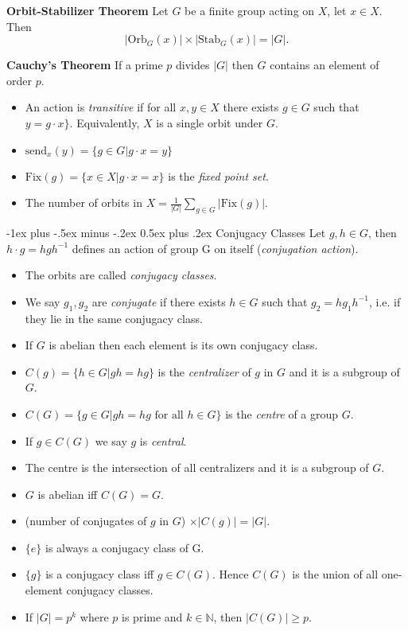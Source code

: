 \documentclass[10pt,landscape]{article}
\makeatletter
\renewcommand{\section}{\@startsection{section}{1}{0mm}%
                                {-1ex plus -.5ex minus -.2ex}%
                                {0.5ex plus .2ex}%
                                {\normalfont\large\bfseries}}
\makeatother
\begin{document}
\begin{multicols}{3}
\columnbreak

\textbf{Orbit-Stabilizer Theorem} Let $G$ be a finite group acting on $X$, let $x\in X$. Then $$ |\text{Orb}_G (x)| \times |\text{Stab}_G (x)| = |G|.$$

\textbf{Cauchy's Theorem} If a prime $p$ divides $|G|$ then $G$ contains an element of order $p$.

\begin{itemize}
	\item An action is \emph{transitive} if for all $x,y \in X$ there exists $g\in G$ such that $y = g \cdot x\}$. Equivalently, $X$ is a single orbit under $G$.
	\item $\text{send}_x (y) = \{g \in G | g \cdot x = y \}$
	\item $\text{Fix}(g) = \{x \in X | g \cdot x = x \}$ is the \emph{fixed point set}.
	\item The number of orbits in $X = \frac{1}{|G|} \sum_{g\in G} |\text{Fix}(g)|.$
\end{itemize}

\section{Conjugacy Classes}
Let $g,h \in G$, then $h \cdot g = hgh^{-1}$ defines an action of group G on itself (\emph{conjugation action}). 
\begin{itemize}
	\item The orbits are called \emph{conjugacy classes}.
	\item We say $g_1,g_2$ are \emph{conjugate} if there exists $h \in G$ such that $g_2 =hg_1h^{-1}$, i.e. if they lie in the same conjugacy class.
	\item If $G$ is abelian then each element is its own conjugacy class.
	\item $C(g) = \{h \in G | gh=hg\}$ is the \emph{centralizer} of $g$ in $G$ and it is a subgroup of $G$.
	\item $C(G) = \{g \in G | gh=hg \text{ for all } h \in G\}$ is the \emph{centre} of a group $G$.
	\item If $g \in C(G)$ we say $g$ is \emph{central}.
	\item The centre is the intersection of all centralizers and it is a subgroup of $G$.
	\item $G$ is abelian iff $C(G) = G$.
	\item (number of conjugates of $g$ in $G$) $\times |C(g)| = |G|$.
	\item $\{e\}$ is always a conjugacy class of G.
	\item $\{g\}$ is a conjugacy class iff $g \in C(G)$. Hence $C(G)$ is the union of all one-element conjugacy classes.
	\item If $|G|=p^k$ where $p$ is prime and $k \in \mathbb{N}$, then $|C(G)| \geq p$.
\end{itemize}


\end{multicols}
\end{document}
